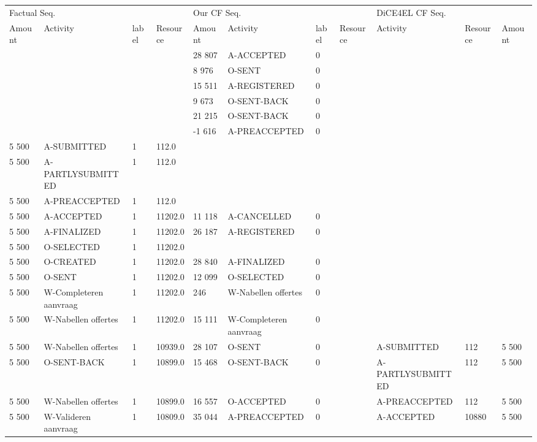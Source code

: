 \begin{tabular}{lllllllllll}
\toprule
\multicolumn{4}{l}{Factual Seq.} & \multicolumn{4}{l}{Our CF Seq.} & \multicolumn{3}{l}{DiCE4EL CF Seq.} \\
Amount & Activity & label & Resource & Amount & Activity & label & Resource & Activity & Resource & Amount \\
\midrule
 &  &  &  & 28 807 & A-ACCEPTED & 0 &  &  &  &  \\
 &  &  &  & 8 976 & O-SENT & 0 &  &  &  &  \\
 &  &  &  & 15 511 & A-REGISTERED & 0 &  &  &  &  \\
 &  &  &  & 9 673 & O-SENT-BACK & 0 &  &  &  &  \\
 &  &  &  & 21 215 & O-SENT-BACK & 0 &  &  &  &  \\
 &  &  &  & -1 616 & A-PREACCEPTED & 0 &  &  &  &  \\
5 500 & A-SUBMITTED & 1 & 112.0 &  &  &  &  &  &  &  \\
5 500 & A-PARTLYSUBMITTED & 1 & 112.0 &  &  &  &  &  &  &  \\
5 500 & A-PREACCEPTED & 1 & 112.0 &  &  &  &  &  &  &  \\
5 500 & A-ACCEPTED & 1 & 11202.0 & 11 118 & A-CANCELLED & 0 &  &  &  &  \\
5 500 & A-FINALIZED & 1 & 11202.0 & 26 187 & A-REGISTERED & 0 &  &  &  &  \\
5 500 & O-SELECTED & 1 & 11202.0 &  &  &  &  &  &  &  \\
5 500 & O-CREATED & 1 & 11202.0 & 28 840 & A-FINALIZED & 0 &  &  &  &  \\
5 500 & O-SENT & 1 & 11202.0 & 12 099 & O-SELECTED & 0 &  &  &  &  \\
5 500 & W-Completeren aanvraag & 1 & 11202.0 & 246 & W-Nabellen offertes & 0 &  &  &  &  \\
5 500 & W-Nabellen offertes & 1 & 11202.0 & 15 111 & W-Completeren aanvraag & 0 &  &  &  &  \\
5 500 & W-Nabellen offertes & 1 & 10939.0 & 28 107 & O-SENT & 0 &  & A-SUBMITTED & 112 & 5 500 \\
5 500 & O-SENT-BACK & 1 & 10899.0 & 15 468 & O-SENT-BACK & 0 &  & A-PARTLYSUBMITTED & 112 & 5 500 \\
5 500 & W-Nabellen offertes & 1 & 10899.0 & 16 557 & O-ACCEPTED & 0 &  & A-PREACCEPTED & 112 & 5 500 \\
5 500 & W-Valideren aanvraag & 1 & 10809.0 & 35 044 & A-PREACCEPTED & 0 &  & A-ACCEPTED & 10880 & 5 500 \\

\end{tabular}

